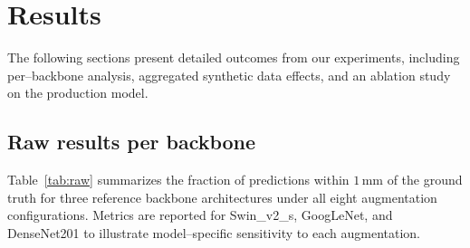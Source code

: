 \documentclass{article}
\begin{document}
\section{Results}
The following sections present detailed outcomes from our experiments, including per–backbone analysis, aggregated synthetic data effects, and an ablation study on the production model.

\subsection{Raw results per backbone}
Table~\ref{tab:raw} summarizes the fraction of predictions within $1\,$mm of the ground truth for three reference backbone architectures under all eight augmentation configurations. Metrics are reported for Swin\_v2\_s, GoogLeNet, and DenseNet201 to illustrate model–specific sensitivity to each augmentation.
\end{document}
